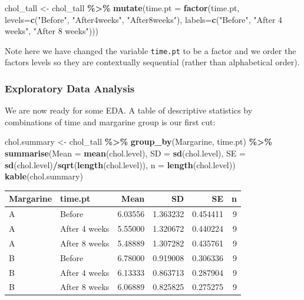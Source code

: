 \documentclass[
]{book}
\newenvironment{Shaded}{\begin{snugshade}}{\end{snugshade}}
\newcommand{\AttributeTok}[1]{\textcolor[rgb]{0.13,0.29,0.53}{#1}}
\newcommand{\FunctionTok}[1]{\textcolor[rgb]{0.13,0.29,0.53}{\textbf{#1}}}
\newcommand{\NormalTok}[1]{#1}
\newcommand{\OtherTok}[1]{\textcolor[rgb]{0.56,0.35,0.01}{#1}}
\newcommand{\SpecialCharTok}[1]{\textcolor[rgb]{0.81,0.36,0.00}{\textbf{#1}}}
\newcommand{\StringTok}[1]{\textcolor[rgb]{0.31,0.60,0.02}{#1}}
\begin{document}
\begin{Shaded}
\begin{Highlighting}[]
\NormalTok{chol\_tall }\OtherTok{\textless{}{-}}\NormalTok{ chol\_tall }\SpecialCharTok{\%\textgreater{}\%}
  \FunctionTok{mutate}\NormalTok{(}\AttributeTok{time.pt =} \FunctionTok{factor}\NormalTok{(time.pt, }
                          \AttributeTok{levels=}\FunctionTok{c}\NormalTok{(}\StringTok{"Before"}\NormalTok{, }\StringTok{"After4weeks"}\NormalTok{, }\StringTok{"After8weeks"}\NormalTok{),}
                          \AttributeTok{labels=}\FunctionTok{c}\NormalTok{(}\StringTok{"Before"}\NormalTok{, }\StringTok{"After 4 weeks"}\NormalTok{, }\StringTok{"After 8 weeks"}\NormalTok{)))}
\end{Highlighting}
\end{Shaded}

Note here we have changed the variable \texttt{time.pt} to be a factor and we order the factors levels so they are contextually sequential (rather than alphabetical order).

\hypertarget{exploratory-data-analysis}{%
\subsubsection{Exploratory Data Analysis}\label{exploratory-data-analysis}}

We are now ready for some EDA. A table of descriptive statistics by combinations of time and margarine group is our first cut:

\begin{Shaded}
\begin{Highlighting}[]
\NormalTok{chol.summary }\OtherTok{\textless{}{-}}\NormalTok{ chol\_tall }\SpecialCharTok{\%\textgreater{}\%}
  \FunctionTok{group\_by}\NormalTok{(Margarine, time.pt) }\SpecialCharTok{\%\textgreater{}\%}
  \FunctionTok{summarise}\NormalTok{(}\AttributeTok{Mean =} \FunctionTok{mean}\NormalTok{(chol.level),}
            \AttributeTok{SD =} \FunctionTok{sd}\NormalTok{(chol.level),}
            \AttributeTok{SE =} \FunctionTok{sd}\NormalTok{(chol.level)}\SpecialCharTok{/}\FunctionTok{sqrt}\NormalTok{(}\FunctionTok{length}\NormalTok{(chol.level)),}
            \AttributeTok{n =} \FunctionTok{length}\NormalTok{(chol.level))}
\FunctionTok{kable}\NormalTok{(chol.summary)}
\end{Highlighting}
\end{Shaded}

\begin{tabular}{l|l|r|r|r|r}
\hline
Margarine & time.pt & Mean & SD & SE & n\\
\hline
A & Before & 6.03556 & 1.363232 & 0.454411 & 9\\
\hline
A & After 4 weeks & 5.55000 & 1.320672 & 0.440224 & 9\\
\hline
A & After 8 weeks & 5.48889 & 1.307282 & 0.435761 & 9\\
\hline
B & Before & 6.78000 & 0.919008 & 0.306336 & 9\\
\hline
B & After 4 weeks & 6.13333 & 0.863713 & 0.287904 & 9\\
\hline
B & After 8 weeks & 6.06889 & 0.825825 & 0.275275 & 9\\
\hline
\end{tabular}
\end{document}
